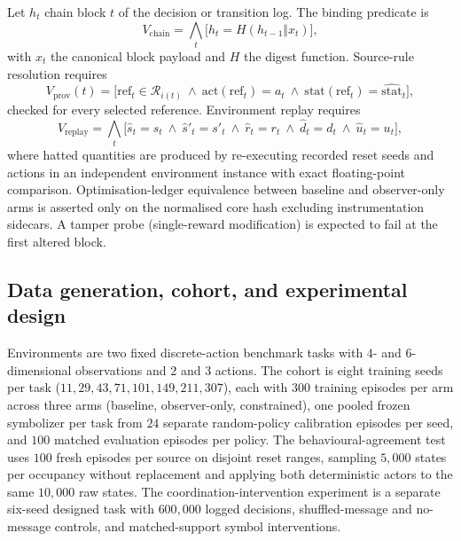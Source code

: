 \documentclass[11pt,a4paper]{article}
\theoremstyle{definition}
\begin{document}
Let $h_t$ chain block $t$ of the decision or transition log. The binding
predicate is
\begin{equation}
V_{\mathrm{chain}} = \bigwedge_{t} \big[h_t = H(h_{t-1} \Vert x_t)\big],
\label{eq:chain}
\end{equation}
with $x_t$ the canonical block payload and $H$ the digest function.
Source-rule resolution requires
\begin{equation}
V_{\mathrm{prov}}(t) = \big[\mathrm{ref}_t \in \mathcal{R}_{i(t)}
\ \wedge\ \mathrm{act}(\mathrm{ref}_t) = a_t
\ \wedge\ \mathrm{stat}(\mathrm{ref}_t) = \widehat{\mathrm{stat}}_t\big],
\label{eq:prov}
\end{equation}
checked for every selected reference. Environment replay requires
\begin{equation}
V_{\mathrm{replay}} = \bigwedge_{t} \big[
\hat{s}_t = s_t\ \wedge\ \hat{s}'_t = s'_t\ \wedge\
\hat{r}_t = r_t\ \wedge\ \hat{d}_t = d_t\ \wedge\ \hat{u}_t = u_t
\big],
\label{eq:replay}
\end{equation}
where hatted quantities are produced by re-executing recorded reset seeds
and actions in an independent environment instance with exact floating-point
comparison. Optimisation-ledger equivalence between baseline and
observer-only arms is asserted only on the normalised core hash excluding
instrumentation sidecars. A tamper probe (single-reward modification) is
expected to fail at the first altered block.

\subsection{Data generation, cohort, and experimental design}

Environments are two fixed discrete-action benchmark tasks with $4$- and
$6$-dimensional observations and $2$ and $3$ actions. The cohort is eight
training seeds per task ($11, 29, 43, 71, 101, 149, 211, 307$), each with
$300$ training episodes per arm across three arms (baseline, observer-only,
constrained), one pooled frozen symbolizer per task from $24$ separate
random-policy calibration episodes per seed, and $100$ matched evaluation
episodes per policy. The behavioural-agreement test uses $100$ fresh episodes
per source on disjoint reset ranges, sampling $5{,}000$ states per occupancy
without replacement and applying both deterministic actors to the same
$10{,}000$ raw states. The coordination-intervention experiment is a separate
six-seed designed task with $600{,}000$ logged decisions, shuffled-message
and no-message controls, and matched-support symbol interventions.
\end{document}
